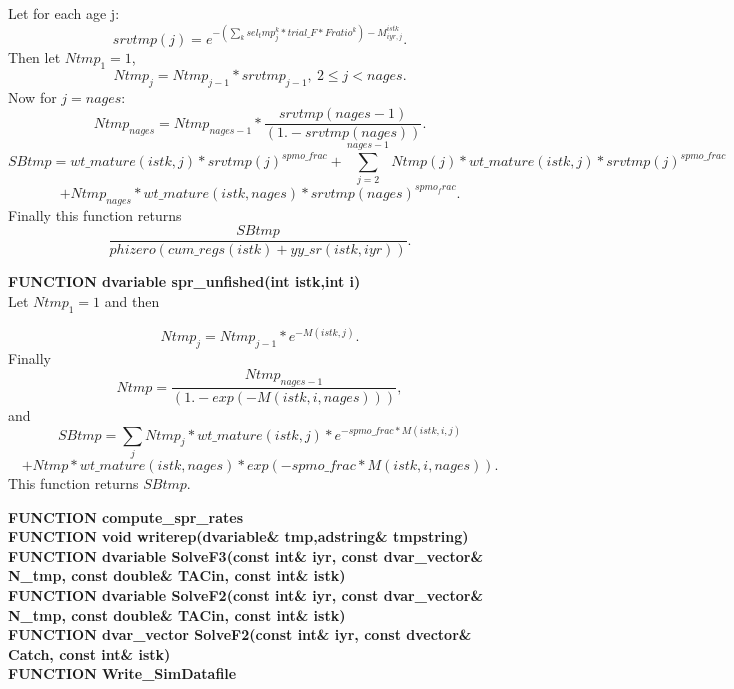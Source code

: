 \documentclass{article}
\begin{document}
Let for each age j:
\begin{equation}
    srvtmp(j)=e^{-(\sum_{k}sel_tmp^k_j*trial\_F*Fratio^k)-M^{istk}_{iyr,j}}.
\end{equation}
Then let $Ntmp_1=1$,
\begin{equation}
    Ntmp_j=Ntmp_{j-1}*srvtmp_{j-1}, \  2\leq j < nages.
\end{equation}
Now for $j=nages$:
\begin{equation}
Ntmp_{nages}=Ntmp_{nages-1}*\dfrac{srvtmp(nages-1)}{(1.-srvtmp(nages))}.
\end{equation}
\begin{equation}
    SBtmp=wt\_mature(istk,j)*srvtmp(j)^{spmo\_frac}+\sum_{ j=2}^{nages-1}Ntmp(j)*wt\_mature(istk,j)*srvtmp(j)^{spmo\_frac} 
\end{equation}
\begin{equation*}
+Ntmp_{nages}*wt\_mature(istk,nages)*srvtmp(nages)^{spmo_frac}.
\end{equation*}
Finally this function returns 
\begin{equation}
    \dfrac{SBtmp}{phizero(cum\_regs(istk)+yy\_sr(istk,iyr))}.
\end{equation}

\textbf{FUNCTION dvariable spr\_unfished(int istk,int i)}\\
Let $Ntmp_1=1$ and then 

\begin{equation*}
    Ntmp_j=Ntmp_{j-1}*e^{-M(istk,j)}.
\end{equation*}
Finally
\begin{equation}
    Ntmp=\dfrac{Ntmp_{nages-1}}{(1.-exp(-M(istk,i,nages)))},
\end{equation}
and
\begin{equation}
    SBtmp=\sum_jNtmp_j*wt\_mature(istk,j)*e^{-spmo\_frac * M(istk,i,j)}
\end{equation}
\begin{equation*}
+Ntmp*wt\_mature(istk,nages)*exp(-spmo\_frac * M(istk,i,nages)).
\end{equation*}
This function returns $SBtmp$.

\textbf{FUNCTION compute\_spr\_rates}\\






\textbf{FUNCTION void writerep(dvariable\& tmp,adstring\& tmpstring)}\\
\textbf{FUNCTION dvariable SolveF3(const int\& iyr, const dvar\_vector\& N\_tmp, const double\&  TACin, const int\& istk)}\\
\textbf{FUNCTION dvariable SolveF2(const int\& iyr, const dvar\_vector\& N\_tmp, const double\&  TACin, const int\& istk)}\\
\textbf{FUNCTION dvar\_vector SolveF2(const int\& iyr, const dvector\&  Catch, const int\& istk)}\\
\textbf{FUNCTION Write\_SimDatafile}\\
\end{document}
